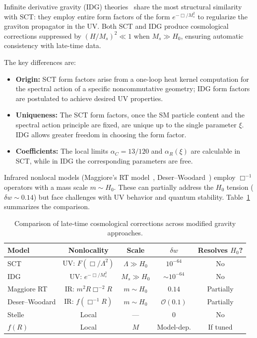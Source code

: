\documentclass[12pt,a4paper]{article}
\newcommand{\order}{\mathcal{O}}
\newcommand{\Lam}{\Lambda}
\theoremstyle{plain}
\theoremstyle{definition}
\begin{document}
Infinite derivative gravity (IDG)
theories~\cite{Biswas:2005qr,Modesto:2011kw,Biswas:2011ar} share the most
structural similarity with SCT: they employ entire form factors of the form
$e^{-\Box/M_s^2}$ to regularize the graviton propagator in the UV.  Both
SCT and IDG produce cosmological corrections suppressed by
$(H/M_s)^2 \ll 1$ when $M_s \gg H_0$, ensuring automatic consistency with
late-time data.

The key differences are:
\begin{itemize}[nosep]
  \item \textbf{Origin:}  SCT form factors arise from a one-loop heat
    kernel computation for the spectral action of a specific
    noncommutative geometry; IDG form factors are postulated to achieve
    desired UV properties.
  \item \textbf{Uniqueness:}  The SCT form factors, once the SM
    particle content and the spectral action principle are fixed, are
    unique up to the single parameter $\xi$.  IDG allows greater freedom
    in choosing the form factor.
  \item \textbf{Coefficients:}  The local limits $\alpha_C = 13/120$ and
    $\alpha_R(\xi)$ are calculable in SCT, while in IDG the corresponding
    parameters are free.
\end{itemize}

Infrared nonlocal models (Maggiore's RT model~\cite{Maggiore:2016gpx},
Deser--Woodard~\cite{Deser:2007jk}) employ $\Box^{-1}$ operators with a
mass scale $m \sim H_0$.  These can partially address the $H_0$ tension
($\delta w \sim 0.14$) but face challenges with UV behavior and quantum
stability.  Table~\ref{tab:comparison} summarizes the comparison.

\begin{table}[H]
\centering
\caption{Comparison of late-time cosmological corrections across modified
gravity approaches.}
\label{tab:comparison}
\begin{tabular}{lcccc}
\toprule
Model & Nonlocality & Scale & $\delta w$ & Resolves $H_0$? \\
\midrule
SCT & UV: $F(\Box/\Lam^2)$ & $\Lam \gg H_0$ & $10^{-64}$ & No \\
IDG & UV: $e^{-\Box/M_s^2}$ & $M_s \gg H_0$ & $\sim 10^{-64}$ & No \\
Maggiore RT & IR: $m^2 R\Box^{-2}R$ & $m \sim H_0$ & $0.14$ & Partially \\
Deser--Woodard & IR: $f(\Box^{-1}R)$ & $m \sim H_0$
  & $\order(0.1)$ & Partially \\
Stelle & Local & --- & $0$ & No \\
$f(R)$ & Local & $M$ & Model-dep. & If tuned \\
\bottomrule
\end{tabular}
\end{table}
\end{document}
